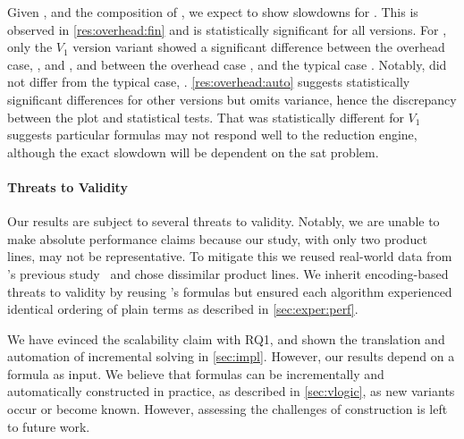 %
 Given ,
and the composition of \fin{}, we expect \vsat{} to show slowdowns for \fin{}.
This is observed in \autoref{res:overhead:fin} and is statistically significant
for all versions. For \auto{}, only the $V_{1}$ version variant showed a
significant difference between the overhead case, \pTov{}, and \vTov{}, and
between the overhead case \pTov{}, and the typical case \vTop{}. Notably,
\vTov{} did not differ from the typical case, \vTop{}.
\autoref{res:overhead:auto} suggests statistically significant differences for
other versions but omits variance, hence the discrepancy between the plot and
statistical tests. That \pTov{} was statistically different for $V_{1}$ suggests
particular formulas may not respond well to the reduction engine, although the
exact slowdown will be dependent on the \ac{sat} problem.

\paragraph{Threats to Validity}
Our results are subject to several threats to validity. Notably, we are unable
to make absolute performance claims because our study, with only two product
lines, may not be representative. To mitigate this we reused real-world data
from \nieke{}'s previous study~\citep{NMS+:GPCE18} and chose dissimilar product
lines. We inherit encoding-based threats to validity by reusing \nieke{}'s
formulas but ensured each algorithm experienced identical ordering of plain
terms as described in \autoref{sec:exper:perf}. 

We have evinced the scalability claim with RQ1, and shown the translation and
automation of incremental solving in \autoref{sec:impl}. However, our results
depend on a \vpl{} formula as input. We believe that \vpl{} formulas can be
incrementally and automatically constructed in practice, as described in
\autoref{sec:vlogic}, as new variants occur or become known. However, assessing
the challenges of \vpl{} construction is left to future work.

